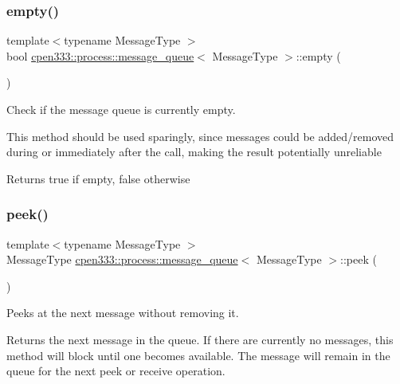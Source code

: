 \subsubsection{\texorpdfstring{empty()}{empty()}}
{\footnotesize\ttfamily template$<$typename Message\+Type $>$ \\
bool \hyperlink{classcpen333_1_1process_1_1message__queue}{cpen333\+::process\+::message\+\_\+queue}$<$ Message\+Type $>$\+::empty (\begin{DoxyParamCaption}{ }\end{DoxyParamCaption})\hspace{0.3cm}{\ttfamily [inline]}}



Check if the message queue is currently empty. 

This method should be used sparingly, since messages could be added/removed during or immediately after the call, making the result potentially unreliable

\begin{DoxyReturn}{Returns}
{\ttfamily true} if empty, {\ttfamily false} otherwise 
\end{DoxyReturn}
\mbox{\label{classcpen333_1_1process_1_1message__queue_a22e2c27bc1fe660b573129f7518ecec7}} 
\subsubsection{\texorpdfstring{peek()}{peek()}\hspace{0.1cm}{\footnotesize\ttfamily [1/2]}}
{\footnotesize\ttfamily template$<$typename Message\+Type $>$ \\
Message\+Type \hyperlink{classcpen333_1_1process_1_1message__queue}{cpen333\+::process\+::message\+\_\+queue}$<$ Message\+Type $>$\+::peek (\begin{DoxyParamCaption}{ }\end{DoxyParamCaption})\hspace{0.3cm}{\ttfamily [inline]}}



Peeks at the next message without removing it. 

Returns the next message in the queue. If there are currently no messages, this method will block until one becomes available. The message will remain in the queue for the next {\ttfamily peek} or {\ttfamily receive} operation.

